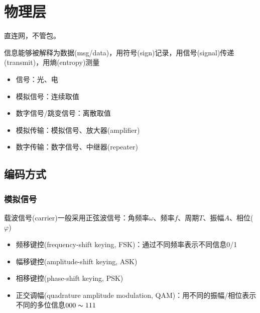 
\section{物理层}
直连网，不管包。

信息能够被解释为数据(msg/data)，用符号(sign)记录，用信号(signal)传递(transmit)，用熵(entropy)测量
\begin{itemize}
	\item 信号：光、电
	\item 模拟信号：连续取值
	\item 数字信号/跳变信号：离散取值
	\item 模拟传输：模拟信号、放大器(amplifier)
	\item 数字传输：数字信号、中继器(repeater)
\end{itemize}

\subsection{编码方式}
\subsubsection{模拟信号}
载波信号(carrier)一般采用正弦波信号：角频率$\omega$、频率$f$、周期$T$、振幅$A$、相位($\varphi$)
\begin{itemize}
	\item 频移键控(frequency-shift keying, FSK)：通过不同频率表示不同信息0/1
	\item 幅移键控(amplitude-shift keying, ASK)
	\item 相移键控(phase-shift keying, PSK)
	\item 正交调幅(quadrature amplitude modulation, QAM)：用不同的振幅/相位表示不同的多位信息$000\thicksim 111$
\end{itemize}

